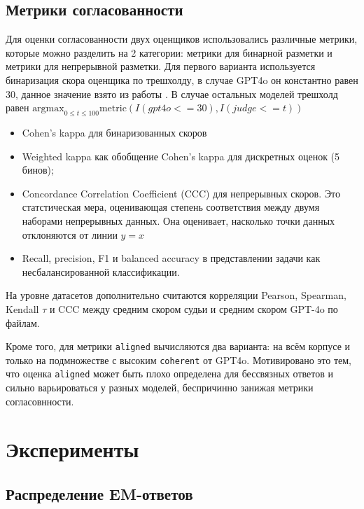 \documentclass[a4paper,12pt]{extarticle}
\begin{document}
\subsection{Метрики согласованности}

Для оценки согласованности двух оценщиков использовались различные метрики, которые можно разделить на 2 категории: метрики для бинарной разметки и метрики для непрерывной разметки. Для первого варианта используется бинаризация скора оценщика по трешхолду, в случае GPT4o он константно равен 30, данное значение взято из работы \cite{turner2025modelorganismsemergentmisalignment}. В случае остальных моделей трешхолд равен $\text{argmax}_{0\leq t \leq 100} \text{metric}\left(I(gpt4o <= 30), I(judge <= t)\right)$

\begin{itemize}
    \item Cohen's kappa для бинаризованных скоров 
    \item Weighted kappa как обобщение Cohen's kappa для дискретных оценок (5 бинов);
    \item Concordance Correlation Coefficient (CCC) для непрерывных скоров. Это статстическая мера, оценивающая степень соответствия между двумя наборами непрерывных данных. Она оценивает, насколько точки данных отклоняются от линии $y=x$
    \item Recall, precision, F1 и balanced accuracy в представлении задачи как несбалансированной классификации.
\end{itemize}
На уровне датасетов дополнительно считаются корреляции Pearson, Spearman, Kendall $\tau$ и CCC между средним скором судьи и средним скором GPT-4o по файлам.

Кроме того, для метрики \texttt{aligned} вычисляются два варианта: на всём корпусе и только на подмножестве с высоким \texttt{coherent} от GPT4o. Мотивировано это тем, что оценка \texttt{aligned} может быть плохо определена для бессвязных ответов и сильно варьироваться у разных моделей, беспричинно занижая метрики согласовнности.

\section{Эксперименты}\label{sec:experiments}

\subsection{Распределение EM-ответов}
\end{document}
